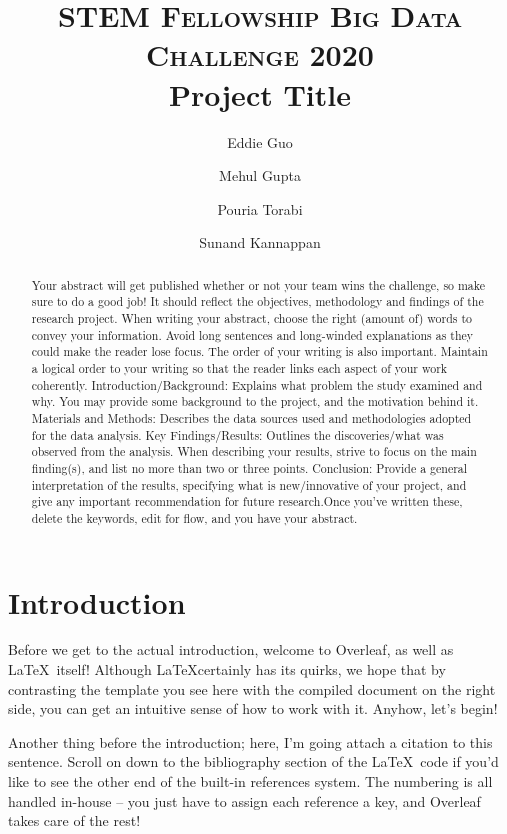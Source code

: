\documentclass[10pt, letterpaper]{article}
\title{
		\usefont{OT1}{bch}{b}{n}
		\normalfont \normalsize \textsc{STEM Fellowship Big Data Challenge 2020} \\ [10pt]
		\huge Project Title \\
}
\author[1]{Eddie Guo}
\author[2]{Mehul Gupta}
\author[1]{Pouria Torabi}
\author[2]{Sunand Kannappan}
\affil[1]{University of Alberta}
\affil[2]{University of Calgary}
\begin{document}
\maketitle

\begin{abstract}
    Your abstract will get published whether or not your team wins the challenge, so make sure to do a good job! It should reflect the objectives, methodology and findings of the research project. When writing your abstract, choose the right (amount of) words to convey your information. Avoid long sentences and long-winded explanations as they could make the reader lose focus. The order of your writing is also important. Maintain a logical order to your writing so that the reader links each aspect of your work coherently. Introduction/Background: Explains what problem the study examined and why. You may provide some background to the project, and the motivation behind it. Materials and Methods: Describes the data sources used and methodologies adopted for the data analysis. Key Findings/Results: Outlines the discoveries/what was observed from the analysis. When describing your results, strive to focus on the main finding(s), and list no more than two or three points. Conclusion: Provide a general interpretation of the results, specifying what is new/innovative of your project, and give any important recommendation for future research.Once you've written these, delete the keywords, edit for flow, and you have your abstract. \vspace{1em}

\end{abstract} \vspace{1em}


\section{Introduction}
Before we get to the actual introduction, welcome to Overleaf, as well as \LaTeX\ itself! Although \LaTeX certainly has its quirks, we hope that by contrasting the template you see here with the compiled document on the right side, you can get an intuitive sense of how to work with it. Anyhow, let's begin!

Another thing before the introduction; here, I'm going attach a citation to this sentence. Scroll on down to the bibliography section of the \LaTeX\ code if you'd like to see the other end of the built-in references system. The numbering is all handled in-house -- you just have to assign each reference a key, and Overleaf takes care of the rest!
\end{document}

